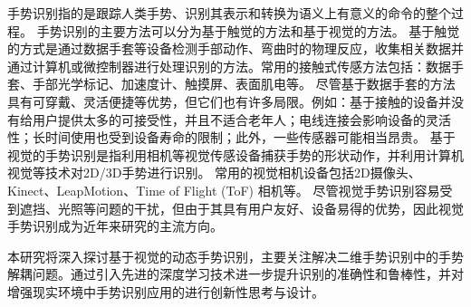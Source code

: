 手势识别指的是跟踪人类手势、识别其表示和转换为语义上有意义的命令的整个过程\cite{rautaray2015vision}。
手势识别的主要方法可以分为基于触觉的方法和基于视觉的方法\cite{oudah2020hand,rautaray2015vision}。
基于触觉的方式是通过数据手套等设备检测手部动作、弯曲时的物理反应，收集相关数据并通过计算机或微控制器进行处理识别的方法。常用的接触式传感方法包括：数据手套、手部光学标记、加速度计、触摸屏、表面肌电等\cite{oudah2020hand}。
尽管基于数据手套的方法具有可穿戴、灵活便捷等优势，但它们也有许多局限。例如：基于接触的设备并没有给用户提供太多的可接受性\cite{rautaray2015vision}，并且不适合老年人；电线连接会影响设备的灵活性；长时间使用也受到设备寿命的限制；此外，一些传感器可能相当昂贵\cite{oudah2020hand}。
基于视觉的手势识别是指利用相机等视觉传感设备捕获手势的形状动作，并利用计算机视觉等技术对2D/3D手势进行识别。
常用的视觉相机设备包括2D摄像头、Kinect、LeapMotion、Time of Flight (ToF) 相机等\cite{基于视觉的动态手势识别研究综述}。
尽管视觉手势识别容易受到遮挡、光照等问题的干扰，但由于其具有用户友好、设备易得的优势，因此视觉手势识别成为近年来研究的主流方向。

本研究将深入探讨基于视觉的动态手势识别，主要关注解决二维手势识别中的手势解耦问题。通过引入先进的深度学习技术进一步提升识别的准确性和鲁棒性，并对增强现实环境中手势识别应用的进行创新性思考与设计。

